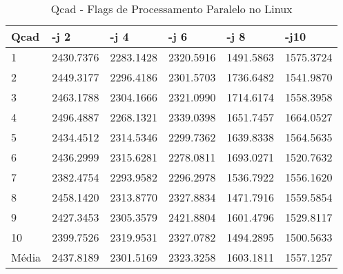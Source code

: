 \begin{table}[!ht]
\centering
\caption{Qcad - Flags de Processamento Paralelo no Linux}
\label{tab:flag_processamento_paralelo:linux:qcad}
\begin{tabular}{llllll}
\textbf{Qcad} & \textbf{-j 2} & \textbf{-j 4} & \textbf{-j 6} & \textbf{-j 8} & \textbf{-j10}  \\ \toprule
1         & 2430.7376 &   2283.1428  &  2320.5916  &  1491.5863 &   1575.3724     \\ 
2         & 2449.3177 &   2296.4186  &  2301.5703  &  1736.6482 &   1541.9870     \\ 
3         & 2463.1788 &   2304.1666  &  2321.0990  &  1714.6174 &   1558.3958     \\ 
4         & 2496.4887 &   2268.1321  &  2339.0398  &  1651.7457 &   1664.0527     \\ 
5         & 2434.4512 &   2314.5346  &  2299.7362  &  1639.8338 &   1564.5635     \\ 
6         & 2436.2999 &   2315.6281  &  2278.0811  &  1693.0271 &   1520.7632     \\ 
7         & 2382.4754 &   2293.9582  &  2296.2978  &  1536.7922 &   1556.1620     \\ 
8         & 2458.1420 &   2313.8770  &  2327.8834  &  1471.7916 &   1559.5854     \\ 
9         & 2427.3453 &   2305.3579  &  2421.8804  &  1601.4796 &   1529.8117     \\ 
10        & 2399.7526 &   2319.9531  &  2327.0782  &  1494.2895 &   1500.5633     \\ \bottomrule
Média     & 2437.8189 &   2301.5169  &  2323.3258  &  1603.1811 &   1557.1257     \\ 
\end{tabular}
\end{table}


